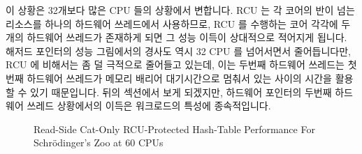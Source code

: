 이 상황은 32개보다 많은 CPU 들의 상황에서 변합니다.
RCU 는 각 코어의 반이 넘는 리소스를 하나의 하드웨어 쓰레드에서 사용하므로, RCU
를 수행하는 코어 각각에 두개의 하드웨어 쓰레드가 존재하게 되면 그 성능 이득이
상대적으로 적어지게 됩니다.
해저드 포인터의 성능 그림에서의 경사도 역시 32 CPU 를 넘어서면서 줄어듭니다만,
RCU 에 비해서는 좀 덜 극적으로 줄어들고 있는데, 이는 두번째 하드웨어 쓰레드는
첫번째 하드웨어 쓰레드가 메모리 배리어 대기시간으로 멈춰서 있는 사이의 시간을
활용할 수 있기 때문입니다.
뒤의 섹션에서 보게 되겠지만, 하드웨어 포인터의 두번째 하드웨어 쓰레드
상황에서의 이득은 워크로드의 특성에 종속적입니다.

\begin{figure}[tb]
\centering
{}
\caption{Read-Side Cat-Only RCU-Protected Hash-Table Performance For Schr\"odinger's Zoo at 60 CPUs}
\label{fig:datastruct:Read-Side Cat-Only RCU-Protected Hash-Table Performance For Schroedinger's Zoo at 60 CPUs}
\end{figure}

